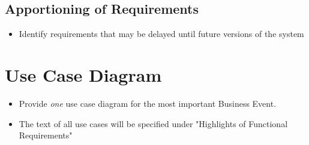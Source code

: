 \documentclass[]{article}
\begin{document}
\subsection{Apportioning of Requirements}
\label{sub:apportioning_of_requirements}
\begin{itemize}
	\item Identify requirements that may be delayed until future versions of the system
\end{itemize}

\section{Use Case Diagram}
\label{sec:use_case_diagram}
\begin{itemize}
	\item Provide \emph{one} use case diagram for the most important Business Event.
	\item The text of all use cases will be specified under "Highlights of Functional Requirements"
\end{itemize}

%
%
%
\end{document}
